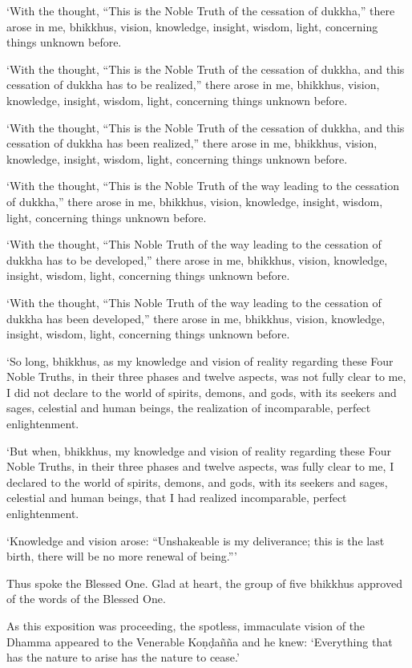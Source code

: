 ‘With the thought, “This is the Noble Truth of the cessation of dukkha,”
there arose in me, bhikkhus, vision, knowledge, insight, wisdom, light,
concerning things unknown before.

‘With the thought, “This is the Noble Truth of the cessation of dukkha,
and this cessation of dukkha has to be realized,” there arose in me,
bhikkhus, vision, knowledge, insight, wisdom, light, concerning things
unknown before.

‘With the thought, “This is the Noble Truth of the cessation of dukkha,
and this cessation of dukkha has been realized,” there arose in me,
bhikkhus, vision, knowledge, insight, wisdom, light, concerning things
unknown before.

‘With the thought, “This is the Noble Truth of the way leading to the
cessation of dukkha,” there arose in me, bhikkhus, vision, knowledge,
insight, wisdom, light, concerning things unknown before.

‘With the thought, “This Noble Truth of the way leading to the cessation
of dukkha has to be developed,” there arose in me, bhikkhus, vision,
knowledge, insight, wisdom, light, concerning things unknown before.

‘With the thought, “This Noble Truth of the way leading to the cessation
of dukkha has been developed,” there arose in me, bhikkhus, vision,
knowledge, insight, wisdom, light, concerning things unknown before.

‘So long, bhikkhus, as my knowledge and vision of reality regarding
these Four Noble Truths, in their three phases and twelve aspects, was
not fully clear to me, I did not declare to the world of spirits,
demons, and gods, with its seekers and sages, celestial and human
beings, the realization of incomparable, perfect enlightenment.

‘But when, bhikkhus, my knowledge and vision of reality regarding these
Four Noble Truths, in their three phases and twelve aspects, was fully
clear to me, I declared to the world of spirits, demons, and gods, with
its seekers and sages, celestial and human beings, that I had realized
incomparable, perfect enlightenment.

‘Knowledge and vision arose: “Unshakeable is my deliverance; this is
the last birth, there will be no more renewal of being.”\thinspace ’

Thus spoke the Blessed One. Glad at heart, the group of five bhikkhus
approved of the words of the Blessed One.

As this exposition was proceeding, the spotless, immaculate vision of
the Dhamma appeared to the Venerable Koṇḍañña and he knew: ‘Everything
that has the nature to arise has the nature to cease.’

